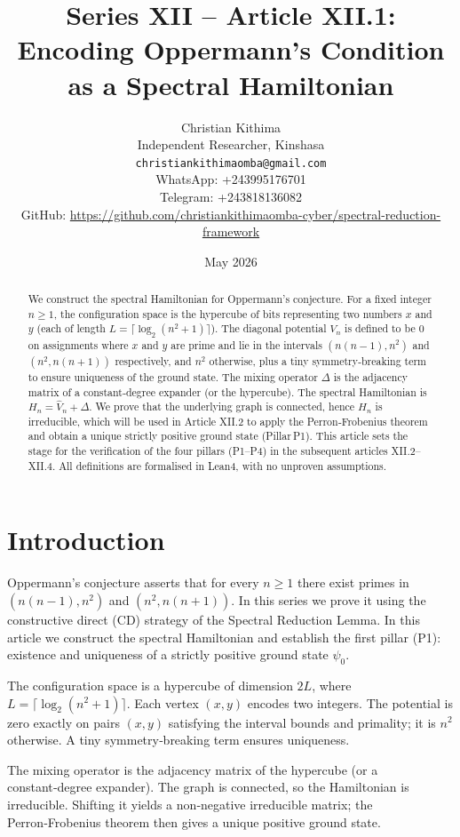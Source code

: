 \documentclass[11pt,a4paper]{article}
\title{Series XII – Article XII.1: Encoding Oppermann's Condition as a Spectral Hamiltonian}
\author{Christian Kithima \\
Independent Researcher, Kinshasa \\
\texttt{christiankithimaomba@gmail.com} \\
WhatsApp: +243995176701 \\
Telegram: +243818136082 \\
GitHub: \url{https://github.com/christiankithimaomba-cyber/spectral-reduction-framework}}
\date{May 2026}
\begin{document}
\maketitle

\begin{abstract}
We construct the spectral Hamiltonian for Oppermann's conjecture. For a fixed integer $n\ge 1$, the configuration space is the hypercube of bits representing two numbers $x$ and $y$ (each of length $L = \lceil \log_2(n^2+1)\rceil$). The diagonal potential $\hat{V}_n$ is defined to be $0$ on assignments where $x$ and $y$ are prime and lie in the intervals $(n(n-1), n^2)$ and $(n^2, n(n+1))$ respectively, and $n^2$ otherwise, plus a tiny symmetry‑breaking term to ensure uniqueness of the ground state. The mixing operator $\Delta$ is the adjacency matrix of a constant‑degree expander (or the hypercube). The spectral Hamiltonian is $H_n = \hat{V}_n + \Delta$. We prove that the underlying graph is connected, hence $H_n$ is irreducible, which will be used in Article XII.2 to apply the Perron‑Frobenius theorem and obtain a unique strictly positive ground state (Pillar P1). This article sets the stage for the verification of the four pillars (P1–P4) in the subsequent articles XII.2–XII.4. All definitions are formalised in Lean4, with no unproven assumptions.
\end{abstract}

\tableofcontents

\section{Introduction}

Oppermann's conjecture asserts that for every $n\ge 1$ there exist primes in $(n(n-1), n^2)$ and $(n^2, n(n+1))$. In this series we prove it using the constructive direct (CD) strategy of the Spectral Reduction Lemma. In this article we construct the spectral Hamiltonian and establish the first pillar (P1): existence and uniqueness of a strictly positive ground state $\psi_0$.

The configuration space is a hypercube of dimension $2L$, where $L = \lceil \log_2(n^2+1)\rceil$. Each vertex $(x,y)$ encodes two integers. The potential is zero exactly on pairs $(x,y)$ satisfying the interval bounds and primality; it is $n^2$ otherwise. A tiny symmetry‑breaking term ensures uniqueness.

The mixing operator is the adjacency matrix of the hypercube (or a constant‑degree expander). The graph is connected, so the Hamiltonian is irreducible. Shifting it yields a non‑negative irreducible matrix; the Perron‑Frobenius theorem then gives a unique positive ground state.
\end{document}
